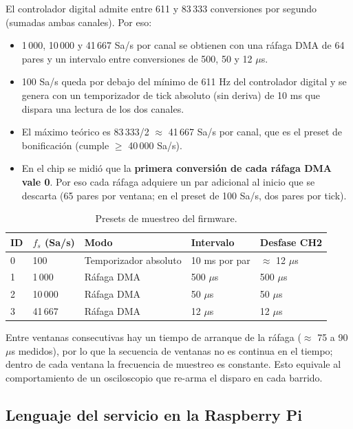 \documentclass[12pt,a4paper]{article}
\begin{document}
El controlador digital admite entre 611 y 83\,333 conversiones por segundo (sumadas ambas canales). Por eso:

\begin{itemize}
  \item 1\,000, 10\,000 y 41\,667 Sa/s por canal se obtienen con una ráfaga DMA de 64 pares y un intervalo entre conversiones de 500, 50 y 12 $\mu$s.
  \item 100 Sa/s queda por debajo del mínimo de 611 Hz del controlador digital y se genera con un temporizador de tick absoluto (sin deriva) de 10 ms que dispara una lectura de los dos canales.
  \item El máximo teórico es 83\,333/2 $\approx$ 41\,667 Sa/s por canal, que es el preset de bonificación (cumple $\geq$ 40\,000 Sa/s).
  \item En el chip se midió que la \textbf{primera conversión de cada ráfaga DMA vale 0}. Por eso cada ráfaga adquiere un par adicional al inicio que se descarta (65 pares por ventana; en el preset de 100 Sa/s, dos pares por tick).
\end{itemize}

\begin{table}[H]
\centering
\small
\begin{tabular}{@{}p{1.0cm} p{2.4cm} p{3.9cm} p{2.8cm} p{2.2cm}@{}}
\toprule
\textbf{ID} & \textbf{$f_s$ (Sa/s)} & \textbf{Modo} & \textbf{Intervalo} & \textbf{Desfase CH2} \\
\midrule
0 & 100    & Temporizador absoluto & 10 ms por par   & $\approx$ 12 $\mu$s \\
1 & 1\,000 & Ráfaga DMA            & 500 $\mu$s      & 500 $\mu$s \\
2 & 10\,000 & Ráfaga DMA           & 50 $\mu$s       & 50 $\mu$s \\
3 & 41\,667 & Ráfaga DMA           & 12 $\mu$s       & 12 $\mu$s \\
\bottomrule
\end{tabular}
\caption{Presets de muestreo del firmware.}
\label{tab:presets}
\end{table}

Entre ventanas consecutivas hay un tiempo de arranque de la ráfaga ($\approx$ 75 a 90 $\mu$s medidos), por lo que la secuencia de ventanas no es continua en el tiempo; dentro de cada ventana la frecuencia de muestreo es constante. Esto equivale al comportamiento de un osciloscopio que re-arma el disparo en cada barrido.

\subsection{Lenguaje del servicio en la Raspberry Pi}
\end{document}

